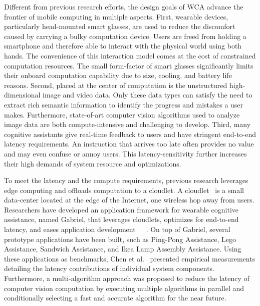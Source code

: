 Different from previous research efforts, the design goals of WCA advance the
frontier of mobile computing in multiple aspects. First, wearable devices,
particularly head-mounted smart glasses, are used to reduce the discomfort
caused by carrying a bulky computation device. Users are freed from holding a
smartphone and therefore able to interact with the physical world using both
hands. The convenience of this interaction model comes at the cost of
constrained computation resources. The small form-factor of smart glasses
significantly limits their onboard computation capability due to size, cooling,
and battery life reasons. Second, placed at the center of computation is the
unstructured high-dimensional image and video data. Only these data types can
satisfy the need to extract rich semantic information to identify the progress
and mistakes a user makes. Furthermore, state-of-art computer vision algorithms
used to analyze image data are both compute-intensive and challenging to
develop. Third, many cognitive assistants give real-time feedback to users and
have stringent end-to-end latency requirements. An instruction that arrives too
late often provides no value and may even confuse or annoy users. This
latency-sensitivity further increases their high demands of system resource and
optimizations.

To meet the latency and the compute requirements, previous research leverages
edge computing and offloads computation to a cloudlet. A
cloudlet~\cite{satyanarayanan2009case} is a small data-center located at the
edge of the Internet, one wireless hop away from users. Researchers have
developed an application framework for wearable cognitive assistance, named
Gabriel, that leverages cloudlets, optimizes for end-to-end latency, and eases
application
development~\cite{chen2018application}~\cite{ha2014towards}~\cite{chen2017empirical}.
On top of Gabriel, several prototype applications have been built, such as
Ping-Pong Assistance, Lego Assistance, Sandwich Assistance, and Ikea Lamp
Assembly Assistance. Using these applications as benchmarks,
Chen et al.~\cite{chen2017empirical} presented empirical measurements detailing the latency
contributions of individual system components. Furthermore, a multi-algorithm
approach was proposed to reduce the latency of computer vision computation by
executing multiple algorithms in parallel and conditionally selecting a fast and
accurate algorithm for the near future.

